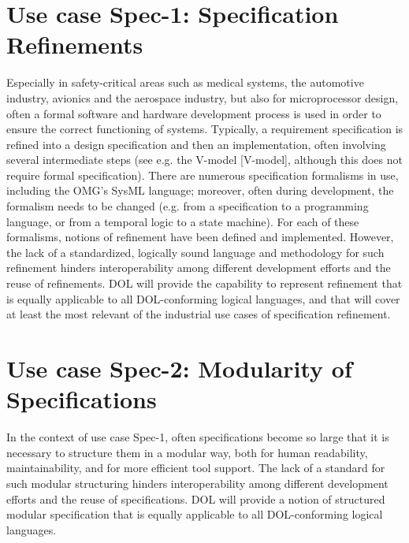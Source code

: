 \documentclass[10pt,%
\ifpretendfinal
final%
\else
draft%
\fi,
]{scrreprt}
\begin{document}
\section{Use case Spec-1: Specification Refinements}
Especially in safety-critical areas such as medical systems, the automotive industry, avionics and the aerospace industry, but also for microprocessor design, often 
a formal software and hardware development process is used in order to ensure the correct functioning of systems. Typically, a requirement specification is refined 
into a design specification and then an implementation, often involving several intermediate steps (see e.g. the V-model [V-model], although this does not require 
formal specification).
There are numerous specification formalisms in use, including the OMG's SysML language; moreover, often during development, the formalism needs to be 
changed (e.g. from a specification to a programming language, or from a temporal logic to a state machine). For each of these formalisms, notions of refinement 
have been defined and implemented. However, the lack of a standardized, logically sound language and methodology for such refinement hinders interoperability 
among different development efforts and the reuse of refinements.
DOL will provide the capability to represent refinement that is equally applicable to all DOL-conforming logical languages, and that will 
cover at least the most relevant of the industrial use cases of specification refinement.

\section{Use case Spec-2: Modularity of Specifications}
In the context of use case Spec-1, often specifications become so large that it is necessary to structure them in a modular way, both for human readability, 
maintainability, and for more efficient tool support. The lack of a standard for such modular structuring hinders interoperability among different development efforts 
and the reuse of specifications.
DOL will provide a notion of structured modular specification that is equally applicable to all DOL-conforming logical languages.
	
\end{document}
